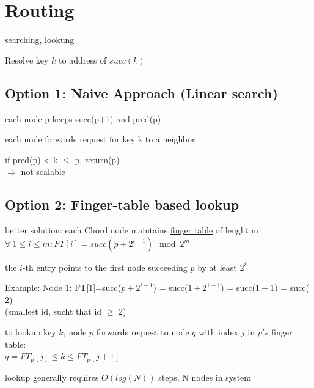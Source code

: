\documentclass[ngerman,a4paper]{report}
\begin{document}
\section{Routing}
\begin{compactitem}
\item searching, lookung
\item Resolve key $k$ to address of $succ(k)$
\end{compactitem}

\subsection{Option 1: Naive Approach (Linear search)}

\begin{compactitem}
\item each node p keeps succ(p+1) and pred(p)
\item each node forwards request for key k to a neighbor
\item if pred(p) < k $\leq$ p, return(p)\\
$\Rightarrow$ not scalable
\end{compactitem}

\subsection{Option 2: Finger-table based lookup}
\begin{compactitem}

\item better solution: each Chord node maintains \underline{finger table} of lenght m\\

$ \forall \  1 \leq i \leq m :	FT[i] = succ(p+2^{i-1}) \mod 2^m $ \\

\item the $i$-th entry points to the first node succeeding $p$ by at least $2^{i-1}$ 
\item Example: Node 1: FT[$1$]=succ($p+2^{i-1}$) = succ($1+2^{1-1}$) = succ($1+1$) = succ($2$) \\ (smallest id, sucht that id $\geq$ 2)
\item to lookup key $k$, node $p$ forwards request to node $q$ with index $j$ in $p's$ finger table:\\
$q = FT_p[j] \leq k \leq FT_p[j+1]$
\item lookup generally requires $O(log(N))$ steps, N nodes in system
\end{compactitem}
\end{document}
